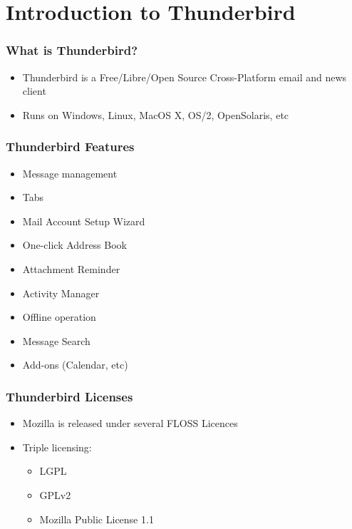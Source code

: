 \documentclass{beamer}
\begin{document}

\section{Introduction to Thunderbird}


\begin{frame}
\frametitle{What is Thunderbird?}
 \begin{itemize}
 \item Thunderbird is a Free/Libre/Open Source Cross-Platform email and news client
 \item Runs on Windows, Linux, MacOS X, OS/2, OpenSolaris, etc
 \end{itemize}
\end{frame}



\begin{frame}
 \frametitle{Thunderbird Features}
 \begin{itemize}
 \item Message management
 \item Tabs
 \item Mail Account Setup Wizard
 \item One-click Address Book
 \item Attachment Reminder
 \item Activity Manager
 \item Offline operation
 \item Message Search
 \item Add-ons (Calendar, etc)
 \end{itemize}
\end{frame}


\begin{frame}
 \frametitle{Thunderbird Licenses}
 \begin{itemize}
 \item Mozilla is released under several FLOSS Licences
 \item Triple licensing:
    \begin{itemize}
     \item LGPL
     \item GPLv2
     \item Mozilla Public License 1.1
    \end{itemize}

 \end{itemize}
\end{frame}
\end{document}
